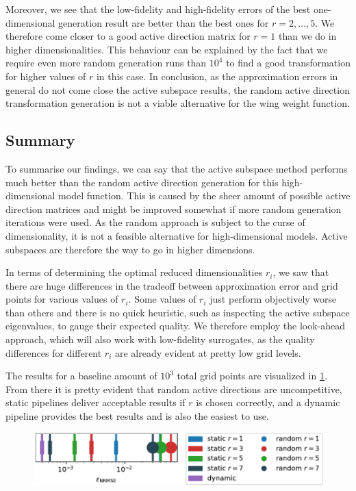 \documentclass[
  a4paper,  %
  twoside,  %
  bibliography=totoc,
  headsepline,
  cleardoublepage=empty,
  parskip=half,
  draft=false
]{scrbook}
\begin{document}
%
Moreover, we see that the low-fidelity and high-fidelity errors of the best one-dimensional generation result are better than the best ones for $r=2, \dots, 5$.
We therefore come closer to a good active direction matrix for $r=1$ than we do in higher dimensionalities.
This behaviour can be explained by the fact that we require even more random generation runs than $10^4$ to find a good transformation for higher values of $r$ in this case.
In conclusion, as the approximation errors in general do not come close the active subspace results, the random active direction transformation generation is not a viable alternative for the wing weight function.

\subsection{Summary}

To summarise our findings, we can say that the active subspace method performs much better than the random active direction generation for this high-dimensional model function.
This is caused by the sheer amount of possible active direction matrices and might be improved somewhat if more random generation iterations were used.
As the random approach is subject to the curse of dimensionality, it is not a feasible alternative for high-dimensional models.
Active subspaces are therefore the way to go in higher dimensions.

In terms of determining the optimal reduced dimensionalities $r_i$, we saw that there are huge differences in the tradeoff between approximation error and grid points for various values of $r_i$.
Some values of $r_i$ just perform objectively worse than others and there is no quick heuristic, such as inspecting the active subspace eigenvalues, to gauge their expected quality.
We therefore employ the look-ahead approach, which will also work with low-fidelity surrogates, as the quality differences for different $r_i$ are already evident at pretty low grid levels.

The results for a baseline amount of $10^3$ total grid points are visualized in \cref{fig:ww_comp}.
From there it is pretty evident that random active directions are uncompetitive, static pipelines deliver acceptable results if $r$ is chosen correctly, and a dynamic pipeline provides the best results and is also the easiest to use.

\begin{mdframed}[style=style]
\begin{figure}[H]
\vspace{-2mm}
\includegraphics[width=\textwidth]{graphics/ww_compare}\vspace{-1mm}
\delimit
{}
\label{fig:ww_comp}
\end{figure}
\end{mdframed}
\end{document}
